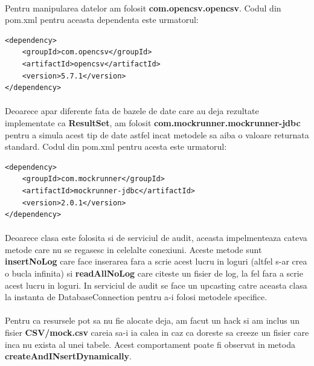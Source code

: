 \documentclass[oneside]{article}
\begin{document}
\paragraph{} Pentru manipularea datelor am folosit \textbf{com.opencsv.opencsv}. Codul din pom.xml pentru aceasta dependenta este urmatorul:

\begin{center}
    \begin{lstlisting}[language=pom]
<dependency>
    <groupId>com.opencsv</groupId>
    <artifactId>opencsv</artifactId>
    <version>5.7.1</version>
</dependency>
    \end{lstlisting}
\end{center}

\paragraph{} Deoarece apar diferente fata de bazele de date care au deja rezultate implementate ca \textbf{ResultSet}, am folosit \textbf{com.mockrunner.mockrunner-jdbc} pentru a simula acest tip de date astfel incat metodele sa aiba o valoare returnata standard. Codul din pom.xml pentru acesta este urmatorul:

\begin{center}
    \begin{lstlisting}[language=pom]
<dependency>
    <groupId>com.mockrunner</groupId>
    <artifactId>mockrunner-jdbc</artifactId>
    <version>2.0.1</version>
</dependency>
    \end{lstlisting}
\end{center}

\paragraph{} Deoarece clasa este folosita si de serviciul de audit, aceasta impelmenteaza cateva metode care nu se regasesc in celelalte conexiuni. Aceste metode sunt \textbf{insertNoLog} care face inserarea fara a scrie acest lucru in loguri (altfel s-ar crea o bucla infinita) si \textbf{readAllNoLog} care citeste un fisier de log, la fel fara a scrie acest lucru in loguri. In serviciul de audit se face un upcasting catre aceasta clasa la instanta de DatabaseConnection pentru a-i folosi metodele specifice.

\paragraph{} Pentru ca resursele pot sa nu fie alocate deja, am facut un hack si am inclus un fisier \textbf{CSV/mock.csv} careia sa-i ia calea in caz ca doreste sa creeze un fisier care inca nu exista al unei tabele. Acest comportament poate fi observat in metoda \textbf{createAndINsertDynamically}.
\end{document}
